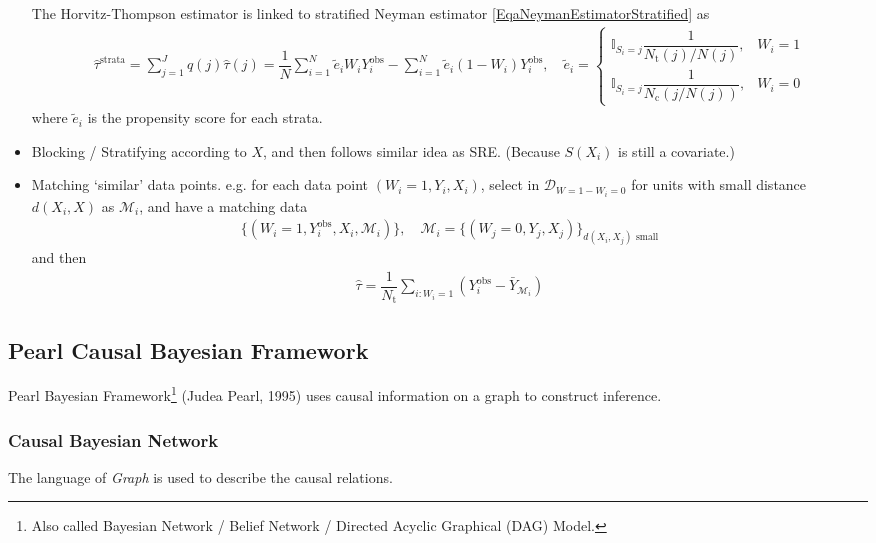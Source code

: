 \begin{itemize}[topsep=2pt,itemsep=0pt]
    The Horvitz-Thompson estimator is linked to stratified Neyman estimator \autoref{EqaNeymanEstimatorStratified} as
    \begin{align*}
         \hat{\tau}^\mathrm{strata}=\sum_{j=1}^Jq(j)\hat{\tau}(j)= \dfrac{1}{N} \sum_{i=1}^N \tilde{e} _iW_iY^\mathrm{obs}_i-\sum_{i=1}^N\tilde{e} _i(1-W_i)Y^\mathrm{obs}_i ,\quad \tilde{e} _i=\begin{cases}
            \mathbb{I}_{S_i=j}\dfrac{1}{N_\mathrm{t}(j)/N(j) },&W_i=1\\
            \mathbb{I}_{S_i=j}\dfrac{1}{N_\mathrm{c}(j/N(j)) },&W_i=0
         \end{cases}
    \end{align*}
    where $ \tilde{e }_i $ is the propensity score for each strata.
    \item Blocking / Stratifying according to $ X $, and then follows similar idea as SRE. (Because $ S(X_i) $ is still a covariate.)
    \item Matching `similar' data points. e.g. for each data point $ (W_i=1,Y_i,X_i) $, select in $ \mathcal{D}_{W=1-W_i=0} $ for units with small distance $ d(X_i,X) $ as $ \mathcal{M}_i $, and have a matching data
    \begin{align*}
        \{(W_i=1,Y_i^\mathrm{obs} ,X_i,\mathcal{M}_i)\},\quad \mathcal{M}_i=\{(W_j=0,Y_j,X_j)\}_{d(X_i,X_j)\text{ small}} 
    \end{align*}
    and then
    \begin{align*}
        \hat{\tau} =\dfrac{1}{N_\mathrm{t} }\sum_{i:W_i=1}\left(Y_i^\mathrm{obs}-\bar{Y}_{\mathcal{M}_i} \right)
    \end{align*}
\end{itemize}


\subsection{Pearl Causal Bayesian Framework}
    Pearl Bayesian Framework\footnote{Also called Bayesian Network / Belief Network / Directed Acyclic Graphical (DAG) Model.} (Judea Pearl, 1995) uses causal information on a graph to construct inference. 

    
\subsubsection{Causal Bayesian Network}
The language of \textit{Graph} is used to describe the causal relations. 

